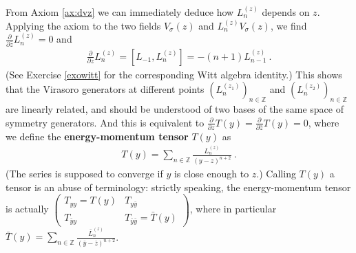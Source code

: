 \documentclass[12pt, a4paper, notitlepage, twoside]{report}
\numberwithin{equation}{section}
\theoremstyle{break}
\begin{document}
From Axiom \ref{ax:dvz} we can immediately deduce how $L_n^{(z)}$ depends on $z$. Applying the axiom to the two fields $V_\sigma(z)$ and $L_n^{(z)}V_\sigma(z)$, we find $\frac{\partial}{\partial \bar z} L_n^{(z)}=0$ and 
\begin{align}
 \frac{\partial}{\partial z} L_n^{(z)} = [L_{-1},L_n^{(z)}] = -(n+1)L_{n-1}^{(z)}\ .
 \label{pll}
\end{align}
(See Exercise \ref{exowitt} for the corresponding Witt algebra identity.)
This shows that the Virasoro generators at different points $(L_n^{(z_1)})_{n\in \mathbb{Z}}$ and $(L_n^{(z_2)})_{n\in \mathbb{Z}}$ are linearly related, and should be understood of two bases of the same space of symmetry generators.
And this is equivalent to $\frac{\partial}{\partial z} T(y) = \frac{\partial}{\partial \bar z} T(y) = 0$, where we define the \textbf{\boldmath energy-momentum tensor} $T(y)$ as 
\begin{align}
 \boxed{T(y) = \sum_{n\in{\mathbb{Z}}} \frac{L_n^{(z)}}{(y-z)^{n+2}}}\ .
\label{tsl}
\end{align}
(The series is supposed to converge if $y$ is close enough to $z$.) Calling $T(y)$ a tensor is an abuse of terminology: strictly speaking, the energy-momentum tensor is actually 
$\left(\begin{smallmatrix} T_{yy} = T(y) & T_{y\bar y} \\ T_{\bar y y} & T_{\bar y \bar y} = \bar T(y) \end{smallmatrix}\right)$, where in particular $\bar T(y)= \sum_{n\in{\mathbb{Z}}} \frac{\bar L_n^{(z)}}{(\bar y-\bar z)^{n+2}}$. 
\end{document}
